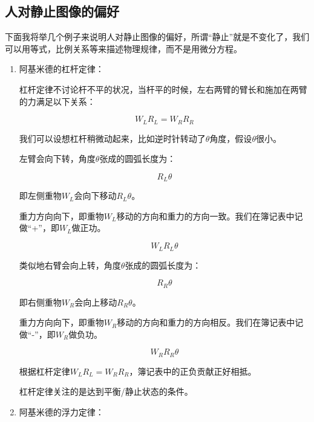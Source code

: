\subsection{人对静止图像的偏好}

下面我将举几个例子来说明人对静止图像的偏好，所谓“静止”就是不变化了，我们可以用等式，比例关系等来描述物理规律，而不是用微分方程。

\begin{enumerate}
\item 

阿基米德的杠杆定律：

杠杆定律不讨论杆不平的状况，当杆平的时候，左右两臂的臂长和施加在两臂的力满足以下关系：

\begin{equation}
W_L R_L  = W_R R_R 
\end{equation}

我们可以设想杠杆稍微动起来，比如逆时针转动了$\theta$角度，假设$\theta$很小。

左臂会向下转，角度$\theta$张成的圆弧长度为：

\begin{equation*}
R_L \theta
\end{equation*}

即左侧重物$W_L$会向下移动$R_L \theta$。

重力方向向下，即重物$W_L$移动的方向和重力的方向一致。我们在簿记表中记做“+”，即$W_L$做正功。

\begin{equation*}
W_L  R_L \theta
\end{equation*}

类似地右臂会向上转，角度$\theta$张成的圆弧长度为：

\begin{equation*}
R_R \theta
\end{equation*}

即右侧重物$W_R$会向上移动$R_R \theta $。

重力方向向下，即重物$W_R$移动的方向和重力的方向相反。我们在簿记表中记做“-”，即$W_R$做负功。

\begin{equation*}
W_R R_R \theta
\end{equation*}

根据杠杆定律$W_L R_L  = W_R R_R$，簿记表中的正负贡献正好相抵。

杠杆定律关注的是达到平衡/静止状态的条件。

\item

阿基米德的浮力定律：


\end{enumerate}
